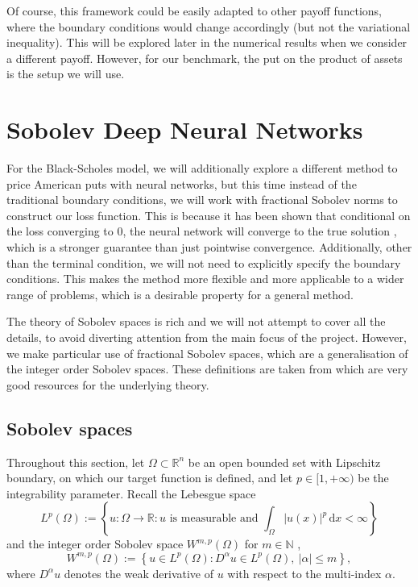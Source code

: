 Of course, this framework could be easily adapted to other payoff functions, where the boundary conditions would change accordingly (but not the variational inequality). This will be explored later in the numerical results when we consider a different payoff. However, for our benchmark, the put on the product of assets is the setup we will use.

\section{Sobolev Deep Neural Networks}

For the Black-Scholes model, we will additionally explore a different method to price American puts with neural networks, but this time instead of the traditional boundary conditions, we will work with fractional Sobolev norms to construct our loss function. This is because it has been shown that conditional on the loss converging to $0$, the neural network will converge to the true solution \cite{zhao2025fractional}, which is a stronger guarantee than just pointwise convergence. Additionally, other than the terminal condition, we will not need to explicitly specify the boundary conditions. This makes the method more flexible and more applicable to a wider range of problems, which is a desirable property for a general method.

The theory of Sobolev spaces is rich and we will not attempt to cover all the details, to avoid diverting attention from the main focus of the project. However, we make particular use of fractional Sobolev spaces, which are a generalisation of the integer order Sobolev spaces. These definitions are taken from \cite{adams2003sobolev, di2012hitchhikers} which are very good resources for the underlying theory.

\subsection{Sobolev spaces}

Throughout this section, let $\Omega \subset \mathbb R^n$ be an open bounded set with Lipschitz boundary, on which our target function is defined, and let $p \in [1, +\infty)$ be the integrability parameter. Recall the Lebesgue space
\begin{equation}
    L^p(\Omega) := \left \{u: \Omega \to \mathbb R : u \text{ is measurable and } \int_\Omega |u(x)|^p \,\mathrm dx < \infty\right\}
\end{equation}
and the integer order Sobolev space $W^{m, p}(\Omega)$ for $m \in \mathbb N$ \cite{adams2003sobolev},
\begin{equation}
    W^{m, p}(\Omega) := \left\{u \in L^p(\Omega) : D^\alpha u \in L^p(\Omega), \ |\alpha| \le m\right\},
\end{equation}
where $D^\alpha u$ denotes the weak derivative of $u$ with respect to the multi-index $\alpha$.

